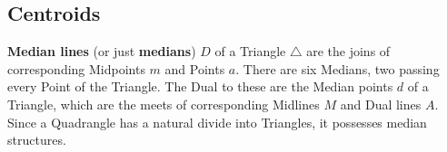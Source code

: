 \documentclass{unswthesis}
\begin{document}
\subsection{\protect\bigskip}

\subsection{Centroids}

\textbf{Median lines} (or just \textbf{medians}) $D$ of a Triangle $%
\triangle $ are the joins of corresponding Midpoints $m$ and Points $a$.
There are six Medians, two passing every Point of the Triangle. The Dual to
these are the Median points $d$ of a Triangle, which are the meets of
corresponding Midlines $M$ and Dual lines $A$. Since a Quadrangle has a
natural divide into Triangles, it possesses median structures.
\end{document}
